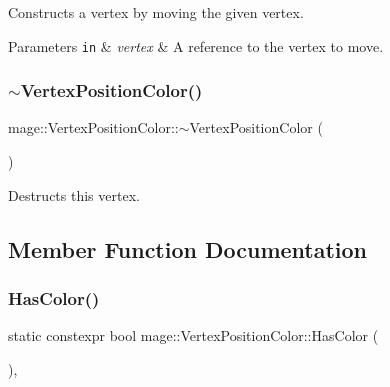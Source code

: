 Constructs a vertex by moving the given vertex.


\begin{DoxyParams}[1]{Parameters}
\mbox{\tt in}  & {\em vertex} & A reference to the vertex to move. \\
\hline
\end{DoxyParams}
\hypertarget{structmage_1_1_vertex_position_color_a18c4400389dfd47482a7d0901d904aec}{}\label{structmage_1_1_vertex_position_color_a18c4400389dfd47482a7d0901d904aec} 
\subsubsection{\texorpdfstring{$\sim$\+Vertex\+Position\+Color()}{~VertexPositionColor()}}
{\footnotesize\ttfamily mage\+::\+Vertex\+Position\+Color\+::$\sim$\+Vertex\+Position\+Color (\begin{DoxyParamCaption}{ }\end{DoxyParamCaption})\hspace{0.3cm}{\ttfamily [default]}}

Destructs this vertex. 

\subsection{Member Function Documentation}
\hypertarget{structmage_1_1_vertex_position_color_ae009d24a1a0fe1b60be9139c8ea62e5c}{}\label{structmage_1_1_vertex_position_color_ae009d24a1a0fe1b60be9139c8ea62e5c} 
\subsubsection{\texorpdfstring{Has\+Color()}{HasColor()}}
{\footnotesize\ttfamily static constexpr bool mage\+::\+Vertex\+Position\+Color\+::\+Has\+Color (\begin{DoxyParamCaption}{ }\end{DoxyParamCaption})\hspace{0.3cm}{\ttfamily [static]}, {\ttfamily [noexcept]}}

